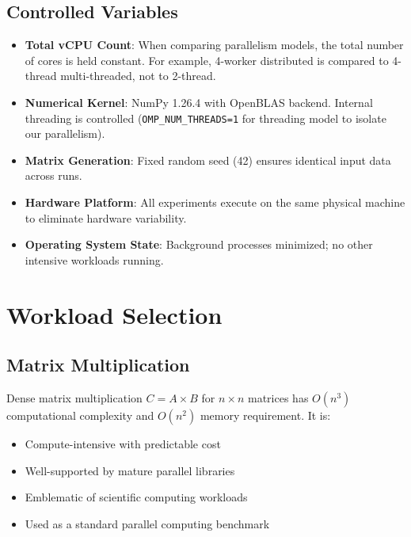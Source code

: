 \subsection{Controlled Variables}

\begin{itemize}
    \item \textbf{Total vCPU Count}: When comparing parallelism models, the total number of cores is held constant. For example, 4-worker distributed is compared to 4-thread multi-threaded, not to 2-thread.
    
    \item \textbf{Numerical Kernel}: NumPy 1.26.4 with OpenBLAS backend. Internal threading is controlled (\texttt{OMP\_NUM\_THREADS=1} for threading model to isolate our parallelism).
    
    \item \textbf{Matrix Generation}: Fixed random seed (42) ensures identical input data across runs.
    
    \item \textbf{Hardware Platform}: All experiments execute on the same physical machine to eliminate hardware variability.
    
    \item \textbf{Operating System State}: Background processes minimized; no other intensive workloads running.
\end{itemize}

\section{Workload Selection}

\subsection{Matrix Multiplication}

Dense matrix multiplication $C = A \times B$ for $n \times n$ matrices has $O(n^3)$ computational complexity and $O(n^2)$ memory requirement. It is:

\begin{itemize}
    \item Compute-intensive with predictable cost
    \item Well-supported by mature parallel libraries
    \item Emblematic of scientific computing workloads
    \item Used as a standard parallel computing benchmark
\end{itemize}

